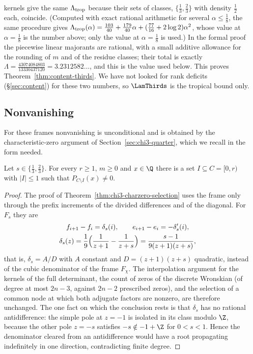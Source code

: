 kernels give the same $\Lambda_{\rm trop}$ because their sets of classes, $\{\frac13,\frac23\}$ with density $\frac12$ each, coincide.
(Computed with exact rational arithmetic for several $\alpha\le\frac18$, the same procedure gives
$\Lambda_{\rm trop}(\alpha)=\frac{103}{40}+\frac{179}{40}\alpha+(\frac{77}{16}+2\log2)\alpha^2$, whose value at $\alpha=\frac18$ is the number above;
only the value at $\alpha=\frac18$ is used.) In the formal proof the piecewise linear majorants are rational, with a small additive allowance for the
rounding of $m$ and of the residue classes; their total is exactly $\Lambda=\frac{43074084803}{13330437120}=3.2312582\ldots$, and this is the value used below.
This proves Theorem~\ref{thm:content-thirds}. We have not looked for rank deficits (\S\ref{sec:content}) for these two
numbers, so $\LamThirds$ is the tropical bound only.

\subsection{Nonvanishing}
For these frames nonvanishing is unconditional and is obtained by the characteristic-zero argument of
Section~\ref{sec:chi3-quarter}, which we recall in the form needed.

\begin{theorem}\label{thm:thirds-nv}
Let $s\in\{\frac13,\frac23\}$. For every $r\ge1$, $m\ge0$ and $x\in\Q$ there is a set $I\subseteq C=[0,r)$ with $|I|\le1$ such that
$P_{C\setminus I}(x)\ne0$.
\end{theorem}

\begin{proof}
The proof of Theorem~\ref{thm:chi3-charzero-selection} uses the frame only through the prefix increments of the
divided differences and of the diagonal. For $F_s$ they are
\[
\begin{gathered}
 f_{i+1}-f_i=\delta_s(i),\qquad e_{i+1}-e_i=-\delta_s'(i),\\
 \delta_s(z)=\frac19\Bigl(\frac1{z+1}-\frac1{z+s}\Bigr)=\frac{s-1}{9(z+1)(z+s)},
\end{gathered}
\]
that is, $\delta_s=A/D$ with $A$ constant and $D=(z+1)(z+s)$ quadratic, instead of the cubic denominator of the frame $F_\chi$. The interpolation
argument for the kernels of the full determinant, the count of zeros of the discrete Wronskian (of degree at most $2n-3$, against $2n-2$ prescribed zeros), and the selection of a common node at which
both adjugate factors are nonzero, are therefore unchanged. The one fact on which the conclusion rests is that $\delta_s$ has no rational
antidifference: the simple pole at $z=-1$ is isolated in its class modulo $\Z$, because the other pole $z=-s$ satisfies $-s\notin-1+\Z$ for
$0<s<1$. Hence the denominator cleared from an antidifference would have a root propagating indefinitely in one direction, contradicting finite degree.
\end{proof}

